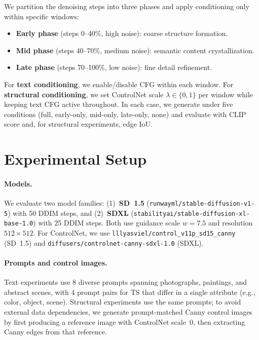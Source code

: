 \documentclass{article}
\begin{document}
We partition the denoising steps into three phases and apply conditioning only within specific windows:
\begin{itemize}[nosep, leftmargin=*]
    \item \textbf{Early phase} (steps 0--40\%, high noise): coarse structure formation.
    \item \textbf{Mid phase} (steps 40--70\%, medium noise): semantic content crystallization.
    \item \textbf{Late phase} (steps 70--100\%, low noise): fine detail refinement.
\end{itemize}
For \textbf{text conditioning}, we enable/disable CFG within each window. For \textbf{structural conditioning}, we set ControlNet scale $\lambda \in \{0, 1\}$ per window while keeping text CFG active throughout. In each case, we generate under five conditions (full, early-only, mid-only, late-only, none) and evaluate with CLIP score and, for structural experiments, edge IoU.

\section{Experimental Setup}
\label{sec:setup}

\paragraph{Models.}
We evaluate two model families: (1)~\textbf{SD~1.5} (\texttt{runwayml/stable-diffusion-v1-5}) with 50 DDIM steps, and (2)~\textbf{SDXL} (\texttt{stabilityai/stable-diffusion-xl-base-1.0}) with 25 DDIM steps. Both use guidance scale $w = 7.5$ and resolution $512 \times 512$. For ControlNet, we use \texttt{lllyasviel/control\_v11p\_sd15\_canny} (SD~1.5) and \texttt{diffusers/controlnet-canny-sdxl-1.0} (SDXL).

\paragraph{Prompts and control images.}
Text experiments use 8 diverse prompts spanning photographs, paintings, and abstract scenes, with 4 prompt pairs for TS that differ in a single attribute (e.g., color, object, scene). Structural experiments use the same prompts; to avoid external data dependencies, we generate prompt-matched Canny control images by first producing a reference image with ControlNet scale~0, then extracting Canny edges from that reference.
\end{document}

